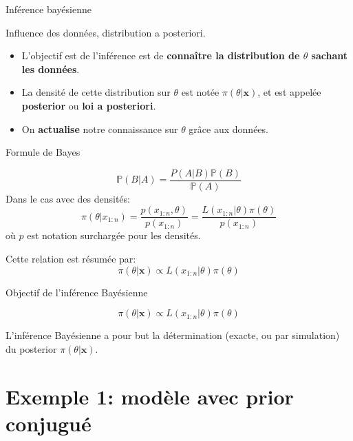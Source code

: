 \documentclass[9pt,ignorenonframetext,]{beamer}
\providecommand{\tightlist}{%
  \setlength{\itemsep}{0pt}\setlength{\parskip}{0pt}}
\begin{document}
\begin{frame}{Inférence bayésienne}
\protect\hypertarget{infuxe9rence-bayuxe9sienne-3}{}

\begin{block}{Influence des données, distribution a posteriori.}

\begin{itemize}
\tightlist
\item
  L'objectif est de l'inférence est de \textbf{connaître la distribution
  de \(\theta\) sachant les données}. \pause
\item
  La densité de cette distribution sur \(\theta\) est notée
  \(\pi(\theta \vert \mathbf{x})\), et est appelée \textbf{posterior} ou
  \textbf{loi a posteriori}.\pause
\item
  On \textbf{actualise} notre connaissance sur \(\theta\) grâce aux
  données.\pause
\end{itemize}

\end{block}

\begin{block}{Formule de Bayes}

\[\mathbb{P}(B\vert A) = \frac{P(A\vert B)\mathbb{P}(B)}{\mathbb{P}(A)}\]
\pause Dans le cas avec des densités: \[
\pi(\theta \vert x_{1:n}) = \frac{p(x_{1:n}, \theta)}{p(x_{1:n})} = \frac{L(x_{1:n} \vert \theta)\pi(\theta)}{p(x_{1:n})}
\] où \(p\) est notation surchargée pour les densités.

Cette relation est résumée par:
\[\pi(\theta \vert \mathbf{x}) \propto L(x_{1:n} \vert \theta)\pi(\theta)\]

\end{block}

\end{frame}

\begin{frame}{Objectif de l'inférence Bayésienne}
\protect\hypertarget{objectif-de-linfuxe9rence-bayuxe9sienne}{}

\[\pi(\theta \vert \mathbf{x}) \propto L(x_{1:n} \vert \theta)\pi(\theta)\]

L'inférence Bayésienne a pour but la détermination (exacte, ou par
simulation) du posterior \(\pi(\theta\vert \mathbf{x})\).

\end{frame}

\hypertarget{exemple-1-moduxe8le-avec-prior-conjuguuxe9}{%
\section{Exemple 1: modèle avec prior
conjugué}\label{exemple-1-moduxe8le-avec-prior-conjuguuxe9}}
\end{document}
